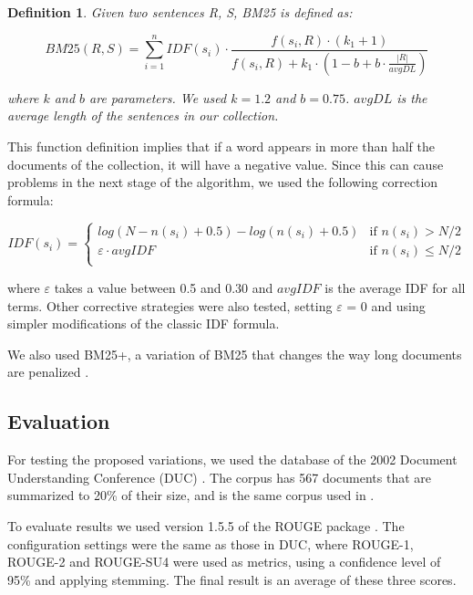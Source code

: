 \documentclass{llncs}
\newtheorem{definicion}{Definition}
\begin{document}
\begin{definicion}
Given two sentences R, S, BM25 is defined as:

\begin{equation}
BM25(R,S) = \sum_{i=1}^{n} IDF(s_i) \cdot \frac{f(s_i, R) \cdot (k_1 + 1)}{f(s_i, R) + k_1 \cdot (1 - b + b \cdot \frac{|R|}{avgDL})}
\end{equation}

where $k$ and $b$ are parameters. We used $k = 1.2$ and $b = 0.75$. $avgDL$ is the average length of the sentences in our collection.
\end{definicion}

This function definition implies that if a word appears in more than half the documents of the collection, it will have a negative value. Since this can cause problems in the next stage of the algorithm, we used the following correction formula:
                
\begin{equation}
 IDF(s_i) =
  \begin{cases}
       log(N - n(s_i) + 0.5) - log(n(s_i) + 0.5)    & \text{if }  n(s_i) > N/2\\
       \varepsilon \cdot avgIDF                     & \text{if }  n(s_i) \leq N/2\\
  \end{cases}
\end{equation}                
                
where $\varepsilon$ takes a value between 0.5 and 0.30 and $avgIDF$ is the average IDF for all terms.
Other corrective strategies were also tested, setting $\varepsilon$ = 0 and using simpler modifications of the classic IDF formula.

We also used BM25+, a variation of BM25 that changes the way long documents are penalized \cite{lv}.


\subsection{Evaluation}
For testing the proposed variations, we used the database of the 2002 Document Understanding Conference (DUC) \cite{duc2002-guidelines}. The corpus has 567 documents that are summarized to 20\% of their size, and is the same corpus used in \cite{mihalcea-tarau}. 

To evaluate results we used version 1.5.5 of the ROUGE package \cite{Lin2004a}. The configuration settings were the same as those in DUC, where ROUGE-1, ROUGE-2 and ROUGE-SU4 were used as metrics, using a confidence level of 95\% and applying stemming. The final result is an average of these three scores.
\end{document}
